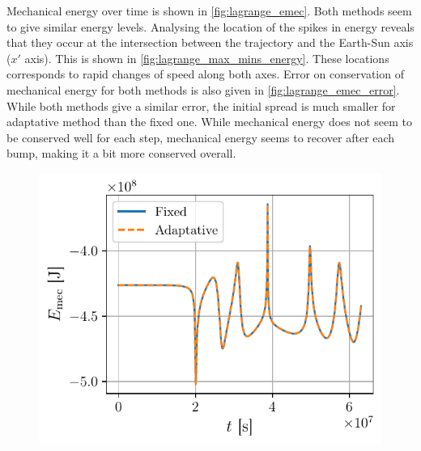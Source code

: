 Mechanical energy over time is shown in \autoref{fig:lagrange_emec}. Both methods seem to give similar energy levels. Analysing the location of the spikes in energy reveals that they occur at the intersection between the trajectory and the Earth-Sun axis (\(x'\) axis). This is shown in \autoref{fig:lagrange_max_mins_energy}. These locations corresponds to rapid changes of speed along both axes. Error on conservation of mechanical energy for both methods is also given in \autoref{fig:lagrange_emec_error}. While both methods give a similar error, the initial spread is much smaller for adaptative method than the fixed one. While mechanical energy does not seem to be conserved well for each step, mechanical energy seems to recover after each bump, making it a bit more conserved overall.
\begin{figure}[H]
    \centering
    \begin{minipage}{.48\textwidth}
        \centering
        \includegraphics[width=\linewidth]{figures/lagrange_emec.pdf}
        \label{fig:lagrange_emec}
    \end{minipage}
    \hspace{0.1cm}
    \begin{minipage}{.48\textwidth}
        \centering

\end{minipage}
\end{figure}
